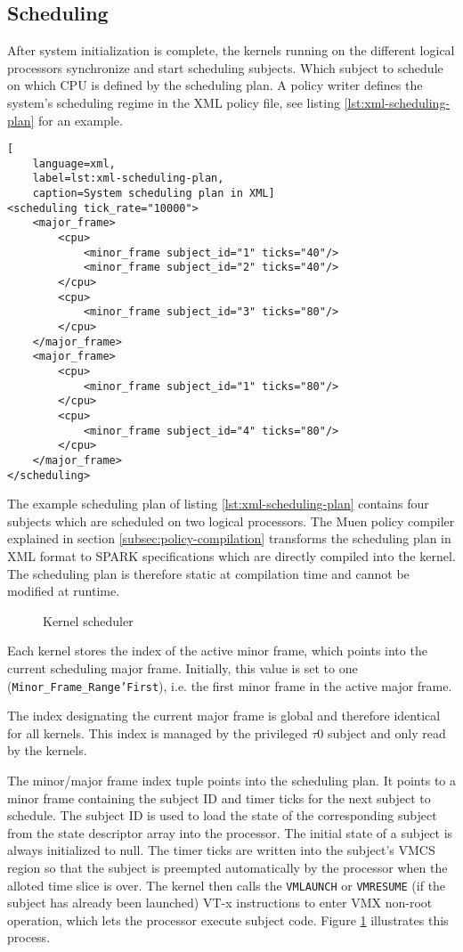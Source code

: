 \subsection{Scheduling}\label{subsec:scheduling}
After system initialization is complete, the kernels running on the different
logical processors synchronize and start scheduling subjects. Which subject to
schedule on which CPU is defined by the scheduling plan. A policy writer defines
the system's scheduling regime in the XML policy file, see listing
\ref{lst:xml-scheduling-plan} for an example.

\begin{lstlisting}[
	language=xml,
	label=lst:xml-scheduling-plan,
	caption=System scheduling plan in XML]
<scheduling tick_rate="10000">
	<major_frame>
		<cpu>
			<minor_frame subject_id="1" ticks="40"/>
			<minor_frame subject_id="2" ticks="40"/>
		</cpu>
		<cpu>
			<minor_frame subject_id="3" ticks="80"/>
		</cpu>
	</major_frame>
	<major_frame>
		<cpu>
			<minor_frame subject_id="1" ticks="80"/>
		</cpu>
		<cpu>
			<minor_frame subject_id="4" ticks="80"/>
		</cpu>
	</major_frame>
</scheduling>
\end{lstlisting}

The example scheduling plan of listing \ref{lst:xml-scheduling-plan} contains
four subjects which are scheduled on two logical processors. The Muen policy
compiler explained in section \ref{subsec:policy-compilation} transforms the
scheduling plan in XML format to SPARK specifications which are directly
compiled into the kernel. The scheduling plan is therefore static at compilation
time and cannot be modified at runtime.

\begin{figure}[h]
	\centering
	
	\caption{Kernel scheduler}
	\label{fig:kernel-scheduler}
\end{figure}

Each kernel stores the index of the active minor frame, which points into the
current scheduling major frame. Initially, this value is set to one
(\texttt{Minor\_Frame\_Range'First}), i.e. the first minor frame in the active
major frame.

The index designating the current major frame is global and therefore identical
for all kernels. This index is managed by the privileged $\tau$0 subject and
only read by the kernels.

The minor/major frame index tuple points into the scheduling plan. It points to
a minor frame containing the subject ID and timer ticks for the next subject to
schedule. The subject ID is used to load the state of the corresponding subject
from the state descriptor array into the processor. The initial state of a
subject is always initialized to null. The timer ticks are written into the
subject's VMCS region so that the subject is preempted automatically by the
processor when the alloted time slice is over. The kernel then calls the
\texttt{VMLAUNCH} or \texttt{VMRESUME} (if the subject has already been
launched) VT-x instructions to enter VMX non-root operation, which lets the
processor execute subject code. Figure \ref{fig:kernel-scheduler} illustrates
this process.

